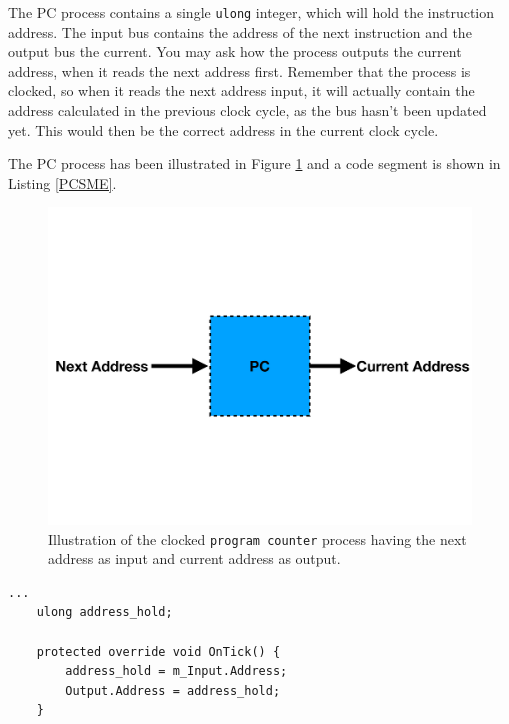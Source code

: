         The PC process contains a single \texttt{ulong} integer, which will hold the instruction address. The input bus contains the address of the next instruction and the output bus the current. You may ask how the process outputs the current address, when it reads the next address first. Remember that the process is clocked, so when it reads the next address input, it will actually contain the address calculated in the previous clock cycle, as the bus hasn't been updated yet. This would then be the correct address in the current clock cycle.
        
        The PC process has been illustrated in Figure \ref{fig:PC} and a code segment is shown in Listing \ref{PCSME}. 
        
        
        
        \begin{figure}[h!]
            \centering
            \includegraphics[scale=0.25]{pictures/PC.pdf}
            \caption{Illustration of the clocked \texttt{program counter} process having the next address as input and current address as output.}
            \label{fig:PC}
        \end{figure}
    
        \begin{minipage}{\linewidth}
            \begin{lstlisting}[language={[Sharp]C}, caption={A slice of the PC unit SME code, which contains variable that holds the input address. On every cycle edge it then holds and outputs the current address.},captionpos=b, label = PCSME]
...
    ulong address_hold;

    protected override void OnTick() {
        address_hold = m_Input.Address;
        Output.Address = address_hold;
    }
            \end{lstlisting}
        \end{minipage}   
    
